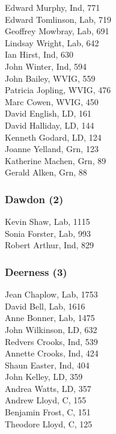 \documentclass[a4paper,openany,10pt]{book}
\begin{document}
Edward Murphy, Ind, 771\\
Edward Tomlinson, Lab, 719\\
Geoffrey Mowbray, Lab, 691\\
Lindsay Wright, Lab, 642\\
Ian Hirst, Ind, 630\\
John Winter, Ind, 594\\
John Bailey, WVIG, 559\\
Patricia Jopling, WVIG, 476\\
Marc Cowen, WVIG, 450\\
David English, LD, 161\\
David Halliday, LD, 144\\
Kenneth Godard, LD, 124\\
Joanne Yelland, Grn, 123\\
Katherine Machen, Grn, 89\\
Gerald Alken, Grn, 88\\


\subsubsection*{Dawdon (2)}



Kevin Shaw, Lab, 1115\\
Sonia Forster, Lab, 993\\
Robert Arthur, Ind, 829\\


\subsubsection*{Deerness (3)}



Jean Chaplow, Lab, 1753\\
David Bell, Lab, 1616\\
Anne Bonner, Lab, 1475\\
John Wilkinson, LD, 632\\
Redvers Crooks, Ind, 539\\
Annette Crooks, Ind, 424\\
Shaun Easter, Ind, 404\\
John Kelley, LD, 359\\
Andrea Watts, LD, 357\\
Andrew Lloyd, C, 155\\
Benjamin Frost, C, 151\\
Theodore Lloyd, C, 125\\
\end{document}
